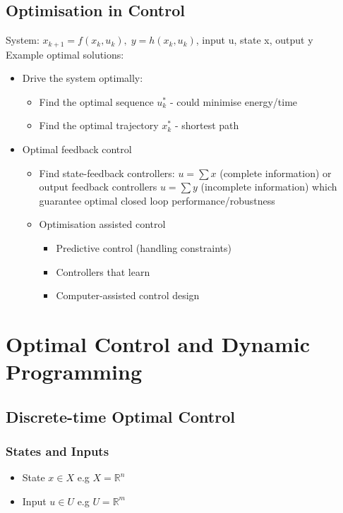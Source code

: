 \documentclass{article}
\begin{document}
\subsection{Optimisation in Control}
System: $x_{k+1} = f(x_k,u_k), \; y = h(x_k,u_k)$, input u, state x, output y \\ 
Example optimal solutions:
\begin{itemize}
    \item Drive the system optimally:
    \begin{itemize}
        \item Find the optimal sequence $u_k^*$ - could minimise energy/time
        \item Find the optimal trajectory $x_k^*$ - shortest path
    \end{itemize}
    \item Optimal feedback control
    \begin{itemize}
        \item Find state-feedback controllers: $u = \sum x$ (complete information) or output feedback controllers $u = \sum y$ (incomplete information) which guarantee optimal closed loop performance/robustness
        \item Optimisation assisted control
        \begin{itemize}
            \item Predictive control (handling constraints)
            \item Controllers that learn
            \item Computer-assisted control design
        \end{itemize}
    \end{itemize}
\end{itemize}
\section{Optimal Control and Dynamic Programming}
\subsection{Discrete-time Optimal Control}
\subsubsection*{States and Inputs}
\begin{itemize}
    \item State $x \in X$ e.g $X = \mathbb{R}^n$
    \item Input $u \in U$ e.g $U = \mathbb{R}^m$
\end{itemize}
\end{document}
